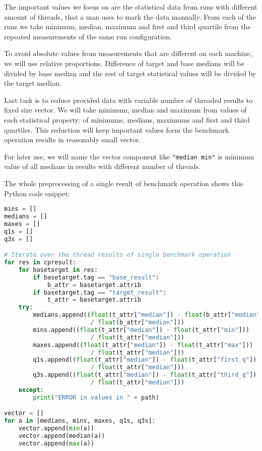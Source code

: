 The important values we focus on are the statistical data from runs with
different amount of threads, that a man uses to mark the data manually. From
each of the runs we take minimum, median, maximum and first and third quartile
from the repeated measurements of the same run configuration.

To avoid absolute values from measurements that are different on each machine,
we will use relative proportions. Difference of target and base medians will be
divided by base median and the rest of target statistical values will be divided
by the target median.

Last task is to reduce provided data with variable number of threaded results
to fixed size vector. We will take minimum, median and maximum from values of
each statistical property: of minimums, medians, maximums and first and third
quartiles. This reduction will keep important values form the benchmark
operation results in reasonably small vector.

For later use, we will name the vector component like \texttt{"median min"} is
minimum value of all medians in results with different number of threads.

The whole preprocessing of a single result of benchmark operation shows this
Python code snippet:
\begin{lstlisting}[language=Python]
mins = []
medians = []
maxes = []
q1s = []
q3s = []

# Iterate over the thread results of single benchmark operation
for res in cpresult:
    for basetarget in res:
        if basetarget.tag == "base_result":
            b_attr = basetarget.attrib
        if basetarget.tag == "target_result":
            t_attr = basetarget.attrib
    try:
        medians.append((float(t_attr["median"]) - float(b_attr["median"]))
                        / float(b_attr["median"]))
        mins.append((float(t_attr["median"]) - float(t_attr["min"]))
                        / float(t_attr["median"]))
        maxes.append((float(t_attr["median"]) - float(t_attr["max"]))
                        / float(t_attr["median"]))
        q1s.append((float(t_attr["median"]) - float(t_attr["first_q"]))
                        / float(t_attr["median"]))
        q3s.append((float(t_attr["median"]) - float(t_attr["third_q"]))
                        / float(t_attr["median"]))
    except:
        print("ERROR in values in " + path)

vector = []
for a in [medians, mins, maxes, q1s, q3s]:
    vector.append(min(a))
    vector.append(median(a))
    vector.append(max(a))
\end{lstlisting}

